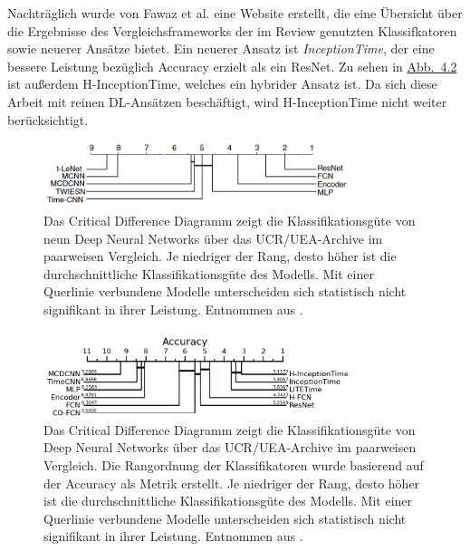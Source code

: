 Nachträglich wurde von Fawaz et al. eine Website \cite{ali_ismail_fawaz_deep_nodate} erstellt, die eine Übersicht über die Ergebnisse des Vergleichsframeworks der im Review genutzten Klassifkatoren sowie neuerer Ansätze bietet. Ein neuerer Ansatz ist \textit{InceptionTime}, der eine bessere Leistung bezüglich Accuracy erzielt als ein \gls{ResNet}. Zu sehen in \hyperref[fig:CritDiff2]{Abb.~4.2} ist außerdem H-InceptionTime, welches ein hybrider Ansatz ist. Da sich diese Arbeit mit reinen \gls{DL}-Ansätzen beschäftigt, wird H-InceptionTime nicht weiter berücksichtigt.

\begin{figure}[!ht]%
\centering
	\includegraphics[width=0.80\textwidth]{./Bilder/crit_diff_review.png}
\caption[Critical Difference Diagramm aktueller Deep Neural Networks]{Das Critical Difference Diagramm zeigt die Klassifikationsgüte von neun Deep Neural Networks über das \gls{UCR}\slash\gls{UEA}-Archive im paarweisen Vergleich. Je niedriger der Rang, desto höher ist die durchschnittliche Klassifikationsgüte des Modells. Mit einer Querlinie verbundene Modelle unterscheiden sich statistisch nicht signifikant in ihrer Leistung. Entnommen aus \cite{ismail_fawaz_deep_2019}.} 
\label{fig:CritDiffReview}
\end{figure}  

\begin{figure}[!ht]%
\centering
	\includegraphics[width=0.80\textwidth]{./Bilder/crit_diff_acc.png}
\caption[Critical Difference Diagramm aktueller Deep Neural Networks und InceptionTime]{Das Critical Difference Diagramm zeigt die Klassifikationsgüte von Deep Neural Networks über das \gls{UCR}\slash\gls{UEA}-Archive im paarweisen Vergleich. Die Rangordnung der Klassifikatoren wurde basierend auf der Accuracy als Metrik erstellt. Je niedriger der Rang, desto höher ist die durchschnittliche Klassifikationsgüte des Modells. Mit einer Querlinie verbundene Modelle unterscheiden sich statistisch nicht signifikant in ihrer Leistung. Entnommen aus \cite{ali_ismail_fawaz_deep_nodate}.} 
\label{fig:CritDiff2}
\end{figure} 

